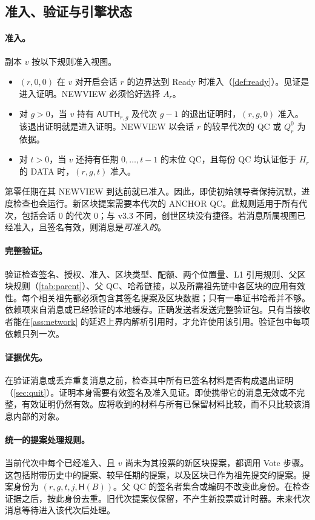 \documentclass[11pt,a4paper]{article}
\newcommand{\Hash}{\mathsf H}
\newcommand{\tagg}[1]{\ensuremath{\mathsf{#1}}}
\begin{document}
\subsection{准入、验证与引擎状态}\label{sec:admission}
\paragraph{准入。}
副本 $v$ 按以下规则准入视图。
\begin{itemize}
\item $(r,0,0)$ 在 $v$ 对开启会话 $r$ 的边界达到 Ready 时准入（\cref{def:ready}）。见证是进入证明。NEWVIEW 必须恰好选择 $A_r$。
\item 对 $g>0$，当 $v$ 持有 $\tagg{AUTH}_{r,g}$ 及代次 $g-1$ 的退出证明时，$(r,g,0)$ 准入。该退出证明就是进入证明。NEWVIEW 以会话 $r$ 的较早代次的 QC 或 $Q_r^0$ 为依据。
\item 对 $t>0$，当 $v$ 还持有任期 $0,\ldots,t-1$ 的末位 QC，且每份 QC 均认证低于 $H_r$ 的 DATA 时，$(r,g,t)$ 准入。
\end{itemize}
第零任期在其 NEWVIEW 到达前就已准入。因此，即使初始领导者保持沉默，进度检查也会运行。新区块提案需要本代次的 ANCHOR QC。此规则适用于所有代次，包括会话 $0$ 的代次 $0$；与 v3.3 不同，创世区块没有捷径。若消息所属视图已经准入，且签名有效，则消息是\emph{可准入的}。

\paragraph{完整验证。}
验证检查签名、授权、准入、区块类型、配额、两个位置量、L1 引用规则、父区块规则（\cref{tab:parent}）、父 QC、哈希链接，以及所需祖先链中各区块的应用有效性。每个相关祖先都必须包含其签名提案及区块数据；只有一串证书哈希并不够。依赖项来自消息或已经验证的本地缓存。正确发送者发送完整验证包。只有当接收者能在\cref{ass:network} 的延迟上界内解析引用时，才允许使用该引用。验证包中每项依赖只列一次。

\paragraph{证据优先。}
在验证消息或丢弃重复消息之前，检查其中所有已签名材料是否构成退出证明（\cref{sec:quit}）。证明本身需要有效签名及准入见证。即使携带它的消息无效或不完整，有效证明仍然有效。应将收到的材料与所有已保留材料比较，而不只比较该消息内部的对象。

\paragraph{统一的提案处理规则。}
当前代次中每个已经准入、且 $v$ 尚未为其投票的新区块提案，都调用 Vote 步骤。这包括附带历史中的提案、较早任期的提案，以及区块已作为祖先提交的提案。提案身份为 $(r,g,t,j,\Hash(B))$。父 QC 的签名者集合或编码不改变此身份。在检查证据之后，按此身份去重。旧代次提案仅保留，不产生新投票或计时器。未来代次消息等待进入该代次后处理。
\end{document}
